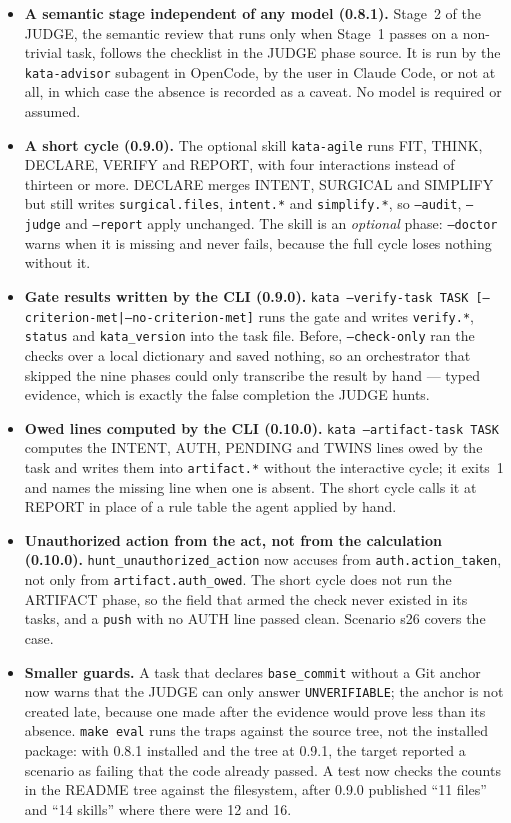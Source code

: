 \documentclass{sbc2019}%
\begin{document}
\begin{itemize}
\item \textbf{A semantic stage independent of any model (0.8.1).} Stage~2
  of the JUDGE, the semantic review that runs only when Stage~1 passes on a
  non-trivial task, follows the checklist in the JUDGE phase source. It is run
  by the \texttt{kata-advisor} subagent in OpenCode, by the user in Claude
  Code, or not at all, in which case the absence is recorded as a caveat. No
  model is required or assumed.
\item \textbf{A short cycle (0.9.0).} The optional skill \texttt{kata-agile}
  runs FIT, THINK, DECLARE, VERIFY and REPORT, with four interactions
  instead of thirteen or more. DECLARE merges INTENT, SURGICAL and SIMPLIFY
  but still writes \texttt{surgical.files}, \texttt{intent.*} and
  \texttt{simplify.*}, so \texttt{--audit}, \texttt{--judge} and
  \texttt{--report} apply unchanged. The skill is an \emph{optional} phase:
  \texttt{--doctor} warns when it is missing and never fails, because the full
  cycle loses nothing without it.
\item \textbf{Gate results written by the CLI (0.9.0).}
  \texttt{kata --verify-task TASK [--criterion-met|--no-criterion-met]} runs
  the gate and writes \texttt{verify.*}, \texttt{status} and
  \texttt{kata\_version} into the task file. Before, \texttt{--check-only}
  ran the checks over a local dictionary and saved nothing, so an
  orchestrator that skipped the nine phases could only transcribe the result
  by hand --- typed evidence, which is exactly the false completion the
  JUDGE hunts.
\item \textbf{Owed lines computed by the CLI (0.10.0).}
  \texttt{kata --artifact-task TASK} computes the INTENT, AUTH, PENDING and
  TWINS lines owed by the task and writes them into \texttt{artifact.*}
  without the interactive cycle; it exits~1 and names the missing line when
  one is absent. The short cycle calls it at REPORT in place of a rule table
  the agent applied by hand.
\item \textbf{Unauthorized action from the act, not from the calculation
  (0.10.0).} \texttt{hunt\_unauthorized\_action} now accuses from
  \texttt{auth.action\_taken}, not only from \texttt{artifact.auth\_owed}.
  The short cycle does not run the ARTIFACT phase, so the field that armed the
  check never existed in its tasks, and a \texttt{push} with no AUTH line
  passed clean. Scenario s26 covers the case.
\item \textbf{Smaller guards.} A task that declares \texttt{base\_commit}
  without a Git anchor now warns that the JUDGE can only answer
  \texttt{UNVERIFIABLE}; the anchor is not created late, because one made
  after the evidence would prove less than its absence. \texttt{make eval}
  runs the traps against the source tree, not the installed package: with
  0.8.1 installed and the tree at 0.9.1, the target reported a scenario as
  failing that the code already passed. A test now checks the counts in the
  README tree against the filesystem, after 0.9.0 published ``11 files'' and
  ``14 skills'' where there were 12 and 16.
\end{itemize}
\end{document}

